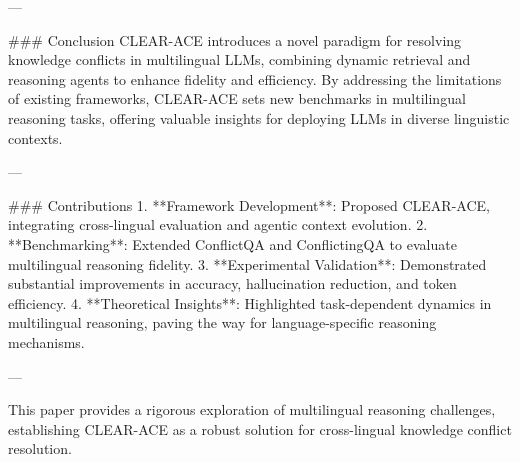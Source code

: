 ---

### Conclusion
CLEAR-ACE introduces a novel paradigm for resolving knowledge conflicts in multilingual LLMs, combining dynamic retrieval and reasoning agents to enhance fidelity and efficiency. By addressing the limitations of existing frameworks, CLEAR-ACE sets new benchmarks in multilingual reasoning tasks, offering valuable insights for deploying LLMs in diverse linguistic contexts.

---

### Contributions
1. **Framework Development**: Proposed CLEAR-ACE, integrating cross-lingual evaluation and agentic context evolution.
2. **Benchmarking**: Extended ConflictQA and ConflictingQA to evaluate multilingual reasoning fidelity.
3. **Experimental Validation**: Demonstrated substantial improvements in accuracy, hallucination reduction, and token efficiency.
4. **Theoretical Insights**: Highlighted task-dependent dynamics in multilingual reasoning, paving the way for language-specific reasoning mechanisms.

---

This paper provides a rigorous exploration of multilingual reasoning challenges, establishing CLEAR-ACE as a robust solution for cross-lingual knowledge conflict resolution.
